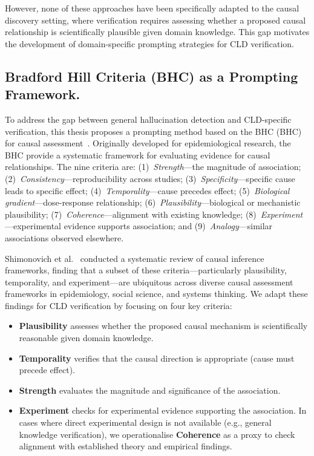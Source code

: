However, none of these approaches have been specifically adapted to the causal discovery setting, where verification requires assessing whether a proposed causal relationship is scientifically plausible given domain knowledge. This gap motivates the development of domain-specific prompting strategies for CLD verification.

\subsection{Bradford Hill Criteria (BHC) as a Prompting Framework.}

To address the gap between general hallucination detection and CLD-specific verification, this thesis proposes a prompting method based on the BHC (BHC) for causal assessment~\citep{shimonovich2020bradford}. Originally developed for epidemiological research, the BHC provide a systematic framework for evaluating evidence for causal relationships. The nine criteria are: (1)~\textit{Strength}---the magnitude of association; (2)~\textit{Consistency}---reproducibility across studies; (3)~\textit{Specificity}---specific cause leads to specific effect; (4)~\textit{Temporality}---cause precedes effect; (5)~\textit{Biological gradient}---dose-response relationship; (6)~\textit{Plausibility}---biological or mechanistic plausibility; (7)~\textit{Coherence}---alignment with existing knowledge; (8)~\textit{Experiment}---experimental evidence supports association; and (9)~\textit{Analogy}---similar associations observed elsewhere.

Shimonovich et al.~\citep{shimonovich2020bradford} conducted a systematic review of causal inference frameworks, finding that a subset of these criteria---particularly plausibility, temporality, and experiment---are ubiquitous across diverse causal assessment frameworks in epidemiology, social science, and systems thinking. We adapt these findings for CLD verification by focusing on four key criteria:

\begin{itemize}
    \item \textbf{Plausibility} assesses whether the proposed causal mechanism is scientifically reasonable given domain knowledge.
    \item \textbf{Temporality} verifies that the causal direction is appropriate (cause must precede effect).
    \item \textbf{Strength} evaluates the magnitude and significance of the association.
    \item \textbf{Experiment} checks for experimental evidence supporting the association. In cases where direct experimental design is not available (e.g., general knowledge verification), we operationalise \textbf{Coherence} as a proxy to check alignment with established theory and empirical findings.
\end{itemize}

